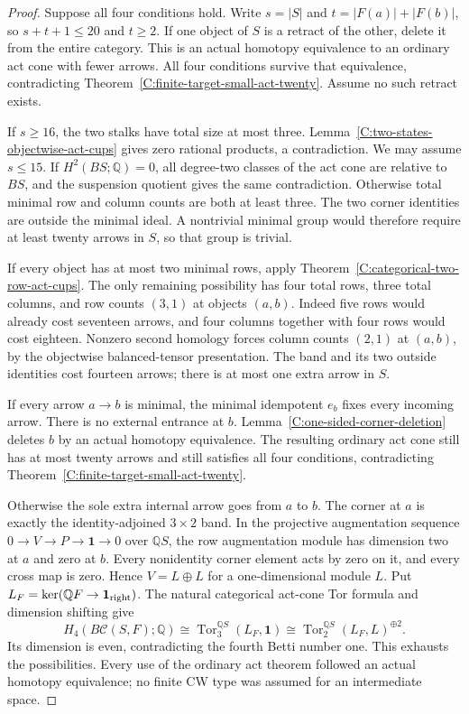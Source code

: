 \begin{proof}
Suppose all four conditions hold. Write $s=|S|$ and
$t=|F(a)|+|F(b)|$, so $s+t+1\leq20$ and $t\geq2$.
If one object of $S$ is a retract of the other, delete it
from the entire category. This is an actual homotopy equivalence
to an ordinary act cone with fewer arrows. All four conditions
survive that equivalence, contradicting
Theorem~\ref{C:finite-target-small-act-twenty}.
Assume no such retract exists.

If $s\geq16$, the two stalks have total size at most three.
Lemma~\ref{C:two-states-objectwise-act-cups} gives zero rational
products, a contradiction. We may assume $s\leq15$.
If $H^2(BS;\mathbb Q)=0$, all degree-two classes of the act
cone are relative to $BS$, and the suspension quotient gives
the same contradiction. Otherwise total minimal row and column
counts are both at least three. The two corner identities are
outside the minimal ideal. A nontrivial minimal group would
therefore require at least twenty arrows in $S$, so that group
is trivial.

If every object has at most two minimal rows, apply
Theorem~\ref{C:categorical-two-row-act-cups}.
The only remaining possibility has four total rows, three total
columns, and row counts $(3,1)$ at objects $(a,b)$.
Indeed five rows would already cost seventeen arrows, and
four columns together with four rows would cost eighteen.
Nonzero second homology forces column counts $(2,1)$ at
$(a,b)$, by the objectwise balanced-tensor presentation.
The band and its two outside identities cost fourteen arrows;
there is at most one extra arrow in $S$.

If every arrow $a\to b$ is minimal, the minimal idempotent
$e_b$ fixes every incoming arrow. There is no external entrance
at $b$. Lemma~\ref{C:one-sided-corner-deletion} deletes $b$
by an actual homotopy equivalence. The resulting ordinary act
cone still has at most twenty arrows and still satisfies all
four conditions, contradicting
Theorem~\ref{C:finite-target-small-act-twenty}.

Otherwise the sole extra internal arrow goes from $a$ to $b$.
The corner at $a$ is exactly the identity-adjoined $3\times2$
band. In the projective augmentation sequence
$0\to V\to P\to\mathbf1\to0$ over $\mathbb QS$, the row
augmentation module has dimension two at $a$ and zero at $b$.
Every nonidentity corner element acts by zero on it, and every
cross map is zero. Hence $V=L\oplus L$ for a one-dimensional
module $L$. Put $L_F=\ker(\mathbb QF\to\mathbf1_{\rm right})$.
The natural categorical act-cone Tor formula and dimension
shifting give
\[
 H_4(B\mathcal C(S,F);\mathbb Q)
 \cong\operatorname{Tor}^{\mathbb QS}_3(L_F,\mathbf1)
 \cong\operatorname{Tor}^{\mathbb QS}_2(L_F,L)^{\oplus2}.
\]
Its dimension is even, contradicting the fourth Betti number
one. This exhausts the possibilities. Every use of the ordinary
act theorem followed an actual homotopy equivalence; no finite
CW type was assumed for an intermediate space.
\end{proof}


